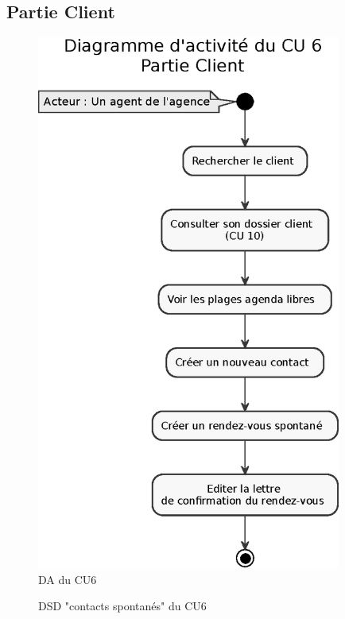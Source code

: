 \subsection{Partie Client}
\begin{figure}[H]
\centering
\includegraphics[width=10cm]{figures/eps/DA_CU6_partieClient.eps}
\caption{DA du CU6}
\end{figure}

\begin{figure}[H]
\noindent{}
\caption{DSD "contacts spontanés" du CU6}
\end{figure}

